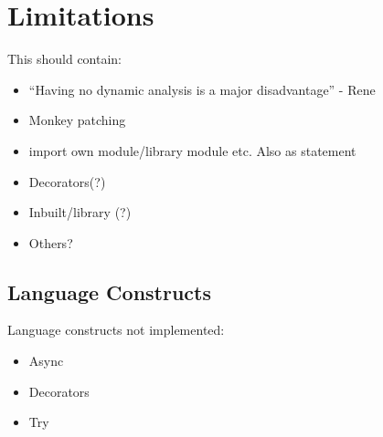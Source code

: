 \section{Limitations}
This should contain:
\begin{itemize}
\item ``Having no dynamic analysis is a major disadvantage'' - Rene
\item Monkey patching
\item import own module/library module etc. Also as statement
\item Decorators(?)
\item Inbuilt/library (?)
\item Others?
\end{itemize}

\subsection{Language Constructs}
Language constructs not implemented:
\begin{itemize}
\item  Async
\item Decorators
\item Try
\end{itemize}

